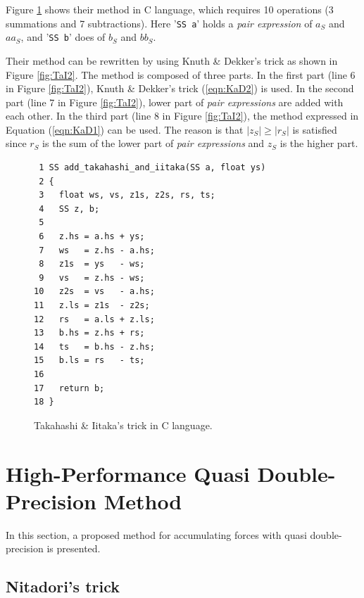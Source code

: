 Figure \ref{fig:TaI} shows their method in C language, 
which requires 10 operations (3 summations and 7 subtractions).
Here '{\tt SS a}' holds a {\it pair expression} of $a_S$ and $aa_S$,
and '{\tt SS b}' does of $b_S$ and $bb_S$.

Their method can be rewritten by using Knuth \& Dekker's trick
as shown in Figure \ref{fig:TaI2}.
The method is composed of three parts.
In the first part (line 6 in Figure \ref{fig:TaI2}),
Knuth \& Dekker's trick (\ref{eqn:KaD2}) is used.
In the second part (line 7 in Figure \ref{fig:TaI2}), 
lower part of {\it pair expressions} are added with each other.
In the third part (line 8 in Figure \ref{fig:TaI2}),
the method expressed in Equation (\ref{eqn:KaD1}) can be used.
The reason is that $|z_S|\geq |r_S|$ is satisfied
since $r_S$ is the sum of the lower part of {\it pair expressions}
and $z_S$ is the higher part.


\begin{figure}
\begin{center}\footnotesize
\begin{minipage}{100mm}\def\baselinestretch{0.8}
\vspace*{-3mm}
\begin{verbatim}
 1 SS add_takahashi_and_iitaka(SS a, float ys)
 2 {
 3   float ws, vs, z1s, z2s, rs, ts;
 4   SS z, b;
 5 
 6   z.hs = a.hs + ys;
 7   ws   = z.hs - a.hs;
 8   z1s  = ys   - ws;
 9   vs   = z.hs - ws;
10   z2s  = vs   - a.hs;
11   z.ls = z1s  - z2s;
12   rs   = a.ls + z.ls;
13   b.hs = z.hs + rs;
14   ts   = b.hs - z.hs;
15   b.ls = rs   - ts;
16 
17   return b;
18 }
\end{verbatim}\def\baselinestretch{1.0}
\end{minipage}
\caption{Takahashi \& Iitaka's trick in C language.}
\label{fig:TaI}
\end{center}
\end{figure}

\section{High-Performance Quasi Double-Precision Method}\label{sec:propose}

In this section, a proposed method for accumulating forces with
quasi double-precision is presented. 

\subsection{Nitadori's trick}

